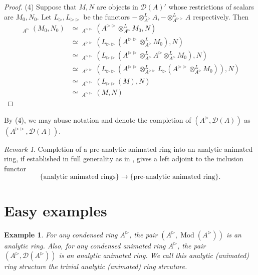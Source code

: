 \documentclass{article}
\theoremstyle{plain}
\newtheorem{exmp}[thm]{Example}
\theoremstyle{definition}
\theoremstyle{remark}
\newtheorem{rmk}[thm]{Remark}
\DeclareMathOperator{\rhoms}{\underline{RHom}}
\DeclareMathOperator{\modcat}{Mod}
\newcommand{\dten}{\otimes ^{L}}
\newcommand{\huflag}{\triangleright}
\newcommand{\D}{\mathcal{D}}
\begin{document}
\begin{proof}
(4)
Suppose that $ M,N $ are objects in $ \D (A)' $ whose restrictions of scalars are $ M _{0}, N _{0} $.
Let $ L _{\huflag}, L _{\huflag\huflag} $ be the functors $ -\dten _{A ^{\huflag}} A, -\dten _{A ^{\huflag\huflag}} A $ respectively.
Then
\begin{align*}
\rhoms _{A ^{\huflag}}(M _{0}, N _{0})
&\simeq \rhoms _{A ^{\huflag\huflag}}(A ^{\huflag\huflag}\dten _{A ^{\huflag}}M _{0}, N)\\
&\simeq \rhoms _{A ^{\huflag\huflag}}(L _{\huflag\huflag}( A ^{\huflag\huflag} \dten _{A ^{\huflag}} M _{0} ), N)\\
&\simeq \rhoms _{A ^{\huflag\huflag}}(L _{\huflag\huflag}( A ^{\huflag\huflag} \dten _{A ^{\huflag}} A ^{\huflag} \dten _{A ^{\huflag}} M _{0} ), N)\\
&\simeq \rhoms _{A ^{\huflag\huflag}}(
L _{\huflag\huflag}( A ^{\huflag\huflag} \dten _{A ^{\huflag\huflag}} L _{\huflag}( A ^{\huflag\huflag} \dten _{A ^{\huflag}} M _{0} ) )
, N)\\
&\simeq \rhoms _{A ^{\huflag\huflag}}(L _{\huflag\huflag}(M), N)\\
&\simeq \rhoms _{A ^{\huflag\huflag}}(M, N)
\end{align*}
\end{proof}

By (4), we may abuse notation and denote the completion of $ (A ^{\huflag}, \D (A)) $ as $ (A ^{\huflag\huflag}, \D (A)) $.

\begin{rmk}
Completion of a pre-analytic animated ring into an analytic animated ring,
if established in full generality as in \cite{rodriguez-camargo_notes_nodate},
gives a left adjoint to the inclusion functor
\begin{equation*}
\{\text{analytic animated rings}\}\to \{\text{pre-analytic animated ring}\}.
\end{equation*}
\end{rmk}

\section{Easy examples}

\begin{exmp}
For any condensed ring $ A ^{\huflag} $, the pair $ (A ^{\huflag}, \modcat (A ^{\huflag})) $ is an analytic ring.
Also, for any condensed animated ring $ A ^{\huflag} $, the pair $ (A ^{\huflag}, \D (A ^{\huflag})) $ is an analytic animated ring.
We call this analytic (animated) ring structure the \emph{trivial} analytic (animated) ring strcuture.
\end{exmp}
\end{document}
